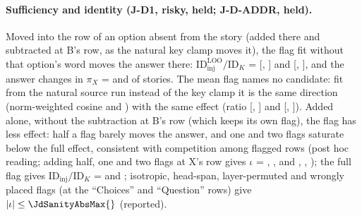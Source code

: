 \begin{table}[!ht]
\centering
\caption{\textbf{The flag: every line of the mechanism tests.} Top: Qwen2.5-7B and Mistral-7B, flags fit on 60 discovery-sample stories and tested on 100 new ones (the ablations of J-D3 on the first 60 of them); bottom: the scale lines at Qwen2.5-1.5B, 3B and 7B (\cref{app:scale}). 95\,\% story-bootstrap intervals. $Q_{\mathrm{IN}}$, $Q_{\mathrm{OUT}}$: \fmtOpt{} asked which option is (is not) mentioned; IOI in-sentence: the four names listed right after the indirect object's mention (\cref{app:sign}). n.e.: not evaluable (gate in brackets). $^\dagger$Recomputed: at 3B the line is not evaluable (too few competent cores), and the post hoc rows are not printed by the scorer.}
\label{tab:flag}
\end{table}

\paragraph{Sufficiency and identity (J-D1, risky, held; J-D-ADDR, held).} Moved into the row of an option absent from the story (added there and subtracted at B's row, as the natural key clamp moves it), the flag fit without that option's word moves the answer there: $\mathrm{ID}_{\mathrm{inj}}^{\mathrm{LOO}}/\mathrm{ID}_K$ = \JdOneRatioQwenSeven{} [\JdOneRatioQwenSevenLo{}, \JdOneRatioQwenSevenHi{}] and \JdOneRatioMistralSeven{} [\JdOneRatioMistralSevenLo{}, \JdOneRatioMistralSevenHi{}], and the answer changes in $\pi_X$ = \JdOnePiXQwenSeven{} and \JdOnePiXMistralSeven{} of stories. The mean flag names no candidate: fit from the natural source run instead of the key clamp it is the same direction (norm-weighted cosine \JdAddrCosQwenSeven{} and \JdAddrCosMistralSeven{}) with the same effect (ratio \JdAddrRatioQwenSeven{} [\JdAddrRatioQwenSevenLo{}, \JdAddrRatioQwenSevenHi{}] and \JdAddrRatioMistralSeven{} [\JdAddrRatioMistralSevenLo{}, \JdAddrRatioMistralSevenHi{}]). Added alone, without the subtraction at B's row (which keeps its own flag), the flag has less effect: half a flag barely moves the answer, and one and two flags saturate below the full effect, consistent with competition among flagged rows (post hoc reading; adding half, one and two flags at X's row gives $\iota$ = \JdDoseHalfQwenSeven{}, \JdDoseOneQwenSeven{}, \JdDoseTwoQwenSeven{} and \JdDoseHalfMistralSeven{}, \JdDoseOneMistralSeven{}, \JdDoseTwoMistralSeven{}); the full flag gives $\mathrm{ID}_{\mathrm{inj}}/\mathrm{ID}_K$ = \JdFullFlagQwenSeven{} and \JdFullFlagMistralSeven{}; isotropic, head-span, layer-permuted and wrongly placed flags (at the ``Choices'' and ``Question'' rows) give $\lvert\iota\rvert \leq \JdSanityAbsMax{}$ (reported).

